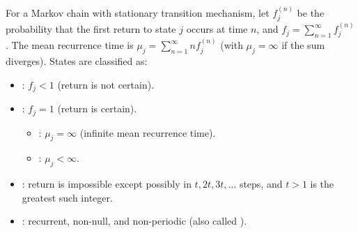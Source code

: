 For a Markov chain with stationary transition mechanism, let $f_j^{(n)}$ be the probability that the first return to state $j$ occurs at time $n$, and $f_j = \sum_{n=1}^{\infty} f_j^{(n)}$. The mean recurrence time is $\mu_j = \sum_{n=1}^{\infty} n f_j^{(n)}$ (with $\mu_j = \infty$ if the sum diverges). States are classified as:

\begin{itemize}
\item {}: $f_j < 1$ (return is not certain).
\item {}: $f_j = 1$ (return is certain).
  \begin{itemize}
  \item {}: $\mu_j = \infty$ (infinite mean recurrence time).
  \item {}: $\mu_j < \infty$.
  \end{itemize}
\item {}: return is impossible except possibly in $t, 2t, 3t, \ldots$ steps, and $t > 1$ is the greatest such integer.
\item {}: recurrent, non-null, and non-periodic (also called ).
\end{itemize}
